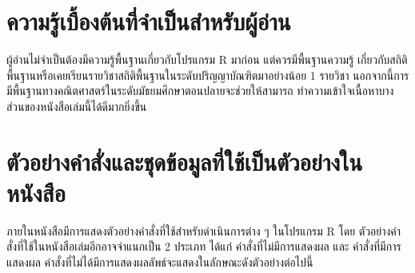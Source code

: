 \documentclass[
  a4paper,
]{book}
\begin{document}
\section*{ความรู้เบื้องต้นที่จำเป็นสำหรับผู้อ่าน}\label{uxe04uxe27uxe32uxe21uxe23uxe40uxe1auxe2duxe07uxe15uxe19uxe17uxe08uxe33uxe40uxe1buxe19uxe2auxe33uxe2buxe23uxe1auxe1cuxe2duxe32uxe19}


ผู้อ่านไม่จำเป็นต้องมีความรู้พื้นฐานเกี่ยวกับโปรแกรม R มาก่อน แต่ควรมีพื้นฐานความรู้
เกี่ยวกับสถิติพื้นฐานหรือเคยเรียนรายวิชาสถิติพื้นฐานในระดับปริญญาบัณฑิตมาอย่างน้อย 1 รายวิชา
นอกจากนี้การมีพื้นฐานทางคณิตศาสตร์ในระดับมัธยมศึกษาตอนปลายจะช่วยให้สามารถ
ทำความเข้าใจเนื้อหาบางส่วนของหนังสือเล่มนี้ได้ดีมากยิ่งขึ้น

\section*{ตัวอย่างคำสั่งและชุดข้อมูลที่ใช้เป็นตัวอย่างในหนังสือ}\label{uxe15uxe27uxe2duxe22uxe32uxe07uxe04uxe33uxe2auxe07uxe41uxe25uxe30uxe0auxe14uxe02uxe2duxe21uxe25uxe17uxe43uxe0auxe40uxe1buxe19uxe15uxe27uxe2duxe22uxe32uxe07uxe43uxe19uxe2buxe19uxe07uxe2auxe2d}


ภายในหนังสือมีการแสดงตัวอย่างคำสั่งที่ใช้สำหรับดำเนินการต่าง ๆ ในโปรแกรม R โดย
ตัวอย่างคำสั่งที่ใช้ในหนังสือเล่มอีกอาจจำแนกเป็น 2 ประเภท ได้แก่ คำสั่งที่ไม่มีการแสดงผล และ
คำสั่งที่มีการแสดงผล คำสั่งที่ไม่ได้มีการแสดงผลลัพธ์จะแสดงในลักษณะดังตัวอย่างต่อไปนี้
\end{document}

